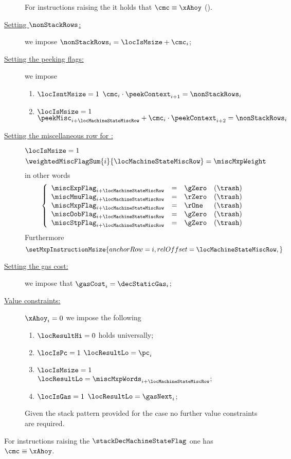 \begin{description}
		\saNote{}
		For instructions raising the \machineStateFlag{} it holds that
		$\cmc \equiv \xAhoy$ (\trash).
	\item[\underline{Setting $\nonStackRows$:}]
		we impose $\nonStackRows_{i} = \locIsMsize + \cmc_{i}$;
	\item[\underline{Setting the peeking flags:}]
		we impose
		\begin{enumerate}
			\item \If $\locIsntMsize = 1$ \Then $\cmc_{i} \cdot \peekContext_{i + 1} = \nonStackRows_{i}$
			\item \If $\locIsMsize   = 1$ \Then $\peekMisc_{i + \locMachineStateMiscRow} + \cmc_{i} \cdot \peekContext_{i + 2} = \nonStackRows_{i}$
		\end{enumerate}
	\item[\underline{Setting the miscellaneous row for \inst{MSIZE}:}]
		\If $\locIsMsize = 1$ \Then
		\[
			\weightedMiscFlagSum {i}{\locMachineStateMiscRow}
			=
			\miscMxpWeight
		\]
		in other words
		\[
			\left\{ \begin{array}{lclr}
				\miscExpFlag_{i + \locMachineStateMiscRow} & = & \gZero  & (\trash) \\
				\miscMmuFlag_{i + \locMachineStateMiscRow} & = & \rZero  & (\trash) \\
				\miscMxpFlag_{i + \locMachineStateMiscRow} & = & \rOne   & (\trash) \\
				\miscOobFlag_{i + \locMachineStateMiscRow} & = & \gZero  & (\trash) \\
				\miscStpFlag_{i + \locMachineStateMiscRow} & = & \gZero  & (\trash) \\
			\end{array} \right.
		\]
		Furthermore
		\[
			\setMxpInstructionMsize {
				anchorRow = i                       ,
				relOffset = \locMachineStateMiscRow ,
			}
		\]
	\item[\underline{Setting the gas cost:}]
		we impose that $\gasCost_{i} = \decStaticGas_{i}$;
	\item[\underline{Value constraints:}]
		\If $\xAhoy_{i} = 0$ \Then we impose the following
		\begin{enumerate}
			\item $\locResultHi = 0$ holds universally;
			\item
				\If $\locIsPc = 1$
				\Then $\locResultLo = \pc_{i}$
			\item
				\If $\locIsMsize = 1$
				\Then $\locResultLo = \miscMxpWords_{i + \locMachineStateMiscRow}$;
			\item
				\If $\locIsGas = 1$
				\Then $\locResultLo = \gasNext_{i}$;
		\end{enumerate}
		\saNote{}
		Given the stack pattern provided for the  case no further value constraints are required.
\end{description}
\saNote{} For instructions raising the $\stackDecMachineStateFlag$ one has $\cmc \equiv \xAhoy$.
